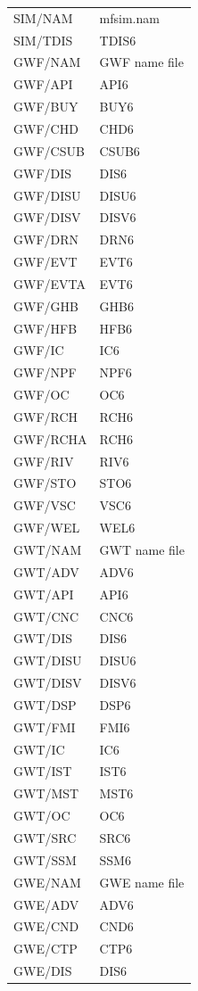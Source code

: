 \begin{longtable}{p{6cm} p{4cm}}
SIM/NAM & mfsim.nam \\
SIM/TDIS & TDIS6 \\
\hline
GWF/NAM & GWF name file \\
GWF/API & API6 \\
GWF/BUY & BUY6 \\
GWF/CHD & CHD6 \\
GWF/CSUB & CSUB6 \\
GWF/DIS & DIS6 \\
GWF/DISU & DISU6 \\
GWF/DISV & DISV6 \\
GWF/DRN & DRN6 \\
GWF/EVT & EVT6 \\
GWF/EVTA & EVT6 \\
GWF/GHB & GHB6 \\
GWF/HFB & HFB6 \\
GWF/IC & IC6 \\
GWF/NPF & NPF6 \\
GWF/OC & OC6 \\
GWF/RCH & RCH6 \\
GWF/RCHA & RCH6 \\
GWF/RIV & RIV6 \\
GWF/STO & STO6 \\
GWF/VSC & VSC6 \\
GWF/WEL & WEL6 \\
\hline
GWT/NAM & GWT name file \\
GWT/ADV & ADV6 \\
GWT/API & API6 \\
GWT/CNC & CNC6 \\
GWT/DIS & DIS6 \\
GWT/DISU & DISU6 \\
GWT/DISV & DISV6 \\
GWT/DSP & DSP6 \\
GWT/FMI & FMI6 \\
GWT/IC & IC6 \\
GWT/IST & IST6 \\
GWT/MST & MST6 \\
GWT/OC & OC6 \\
GWT/SRC & SRC6 \\
GWT/SSM & SSM6 \\
\hline
GWE/NAM & GWE name file \\
GWE/ADV & ADV6 \\
GWE/CND & CND6 \\
GWE/CTP & CTP6 \\
GWE/DIS & DIS6 \\ 

\end{longtable}
